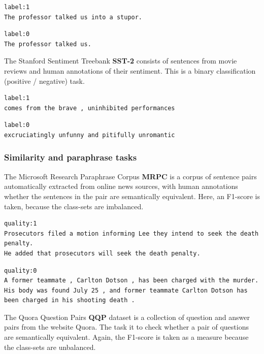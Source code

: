 \documentclass[a4paper,12pt,oneside,openright]{report}
\begin{document}
\begin{verbatim}
label:1
The professor talked us into a stupor.
\end{verbatim}

\begin{verbatim}
label:0	
The professor talked us.
\end{verbatim}

The Stanford Sentiment Treebank \textbf{SST-2} \cite{socher2013} consists of sentences from movie reviews and human annotations of their sentiment.
This is a binary classification (positive / negative) task.

\begin{verbatim}
label:1
comes from the brave , uninhibited performances
\end{verbatim}

\begin{verbatim}
label:0
excruciatingly unfunny and pitifully unromantic
\end{verbatim}

\subsubsection{Similarity and paraphrase tasks}

The Microsoft Research Paraphrase Corpus \textbf{MRPC} \cite{dolan2005} is a corpus of sentence pairs automatically extracted from online news sources, with human annotations whether the sentences in the pair are semantically equivalent.
Here, an F1-score is taken, because the class-sets are imbalanced.


\begin{verbatim}
quality:1	
Prosecutors filed a motion informing Lee they intend to seek the death penalty.	
He added that prosecutors will seek the death penalty.
\end{verbatim}

\begin{verbatim}
quality:0	
A former teammate , Carlton Dotson , has been charged with the murder.	
His body was found July 25 , and former teammate Carlton Dotson has been charged in his shooting death .
\end{verbatim}

The Quora Question Pairs \textbf{QQP} \cite{shankar17} dataset is a collection of question and answer pairs from the website Quora. 
The task it to check whether a pair of questions are semantically equivalent.
Again, the F1-score is taken as a measure because the class-sets are unbalanced.
\end{document}

